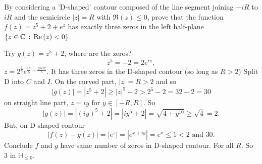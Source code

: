 \documentclass[10pt, a4paper]{article}
\begin{document}
\begin{problem}
    By considering a
    'D-shaped'
    contour composed of the line segment joining $-iR$ to $iR$ and the semicircle $|z| = R$ with $\Re(z) \leq 0$,
    prove that the function $f(z) = z ^ 5 + 2 + e ^ z$ has exactly three zeros in the left half-plane $\{z \in \mathbb{C}\,:\,\mathrm{Re}\,(z) < 0\}$.

    \begin{solution}
        Try $g(z) = z ^ 5 + 2$,
        where are the zeros?
        \[
        z ^ 5 = -2 = 2e ^ {i\pi},
        \]
        $z = 2 ^ {\frac{1}{5}}e ^ {\frac{i\pi}{5} + \frac{2mi\pi}{5}}$.
        It has three zeros in the D-shaped contour
        (so long as $R > 2$)
        Split D into $C$ and $I$.
        On the curved part,
        $|z| = R > 2$ and so
        \[
        |g(z)| = |z ^ 5 + 2| \geq |z| ^ 5 - 2 > 2 ^ 5 - 2 = 32 - 2 = 30
        \]
        on straight line part,
        $z = iy$ for $y \in [-R, R]$.
        So
        \[
        |g(z)| = |(iy) ^ 5 + 2| = |iy ^ 5 + 2| = \sqrt{4 + y ^ {10}} \geq \sqrt{4} = 2.
        \]
        But,
        on D-shaped contour
        \[
        |f(z) - g(z)| = |e ^ z| = |e ^ {x + iy}| = e ^ x \leq 1 < 2\text{ and } 30.
        \]
        Conclude $f$ and $g$ have same number of zeros in D-shaped contour.
        For all $R$.
        So $3$ in $\mathbb{H}_{\leq 0}$.
    \end{solution}
\end{problem}
\end{document}
